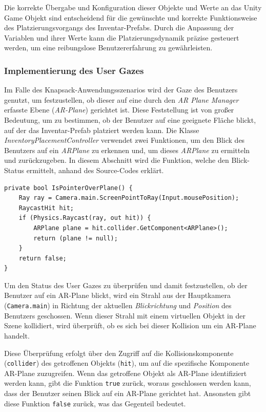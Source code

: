 Die korrekte Übergabe und Konfiguration dieser Objekte und Werte an das Unity Game Objekt sind entscheidend für die
gewünschte und korrekte Funktionsweise des Platzierungsvorgangs des Inventar-Prefabs. Durch die Anpassung der Variablen
und ihrer Werte kann die Platzierungsdynamik präzise gesteuert werden, um eine reibungslose Benutzererfahrung zu gewährleisten.

\subsubsection{Implementierung des User Gazes}
Im Falle des Knapsack-Anwendungsszenarios wird der Gaze des Benutzers genutzt, um festzustellen, ob dieser auf eine durch
den \textit{AR Plane Manager} erfasste Ebene (\textit{AR-Plane}) gerichtet ist. Diese Feststellung ist von großer Bedeutung,
um zu bestimmen, ob der Benutzer auf eine geeignete Fläche blickt, auf der das Inventar-Prefab platziert werden kann. Die
Klasse \textit{InventoryPlacementController} verwendet zwei Funktionen, um den Blick des Benutzers auf ein \textit{ARPlane}
zu erkennen und, um dieses \textit{ARPlane} zu ermitteln und zurückzugeben. In diesem Abschnitt wird die Funktion, welche
den Blick-Status ermittelt, anhand des Source-Codes erklärt.
\begin{lstlisting}[caption={Funktion zur Überprüfung des User Gazes}, label=code:isPOP]
private bool IsPointerOverPlane() {
    Ray ray = Camera.main.ScreenPointToRay(Input.mousePosition);
    RaycastHit hit;
    if (Physics.Raycast(ray, out hit)) {
        ARPlane plane = hit.collider.GetComponent<ARPlane>();
        return (plane != null);
    }
    return false;
}
\end{lstlisting}
Um den Status des User Gazes zu überprüfen und damit festzustellen, ob der Benutzer auf ein AR-Plane blickt, wird ein
Strahl aus der Hauptkamera (\texttt{Camera.main}) in Richtung der aktuellen \textit{Blickrichtung} und \textit{Position}
des Benutzers geschossen. Wenn dieser Strahl mit einem virtuellen Objekt in der Szene kollidiert, wird überprüft, ob es
sich bei dieser Kollision um ein AR-Plane handelt.

Diese Überprüfung erfolgt über den Zugriff auf die Kollisionskomponente (\texttt{collider}) des getroffenen Objekts (\texttt{hit}),
um auf die spezifische Komponente AR-Plane zuzugreifen. Wenn das getroffene Objekt als AR-Plane identifiziert werden kann,
gibt die Funktion \texttt{true} zurück, woraus geschlossen werden kann, dass der Benutzer seinen Blick auf ein AR-Plane
gerichtet hat. Ansonsten gibt diese Funktion \texttt{false} zurück, was das Gegenteil bedeutet.

